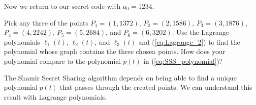 Now we return to our secret code with $a_0 = 1234$. 

\begin{pactivity} Pick any three of the points $P_1 = (1,1372)$, $P_2 = (2,1586)$, $P_3 = (3,1876)$, $P_4 = (4,2242)$, $P_5 = (5,2684)$, and $P_6 = (6,3202)$. Use the Lagrange polynomials $\ell_1(t)$, $\ell_2(t)$, and $\ell_3(t)$ and (\ref{eq:Lagrange_2}) to find the polynomial whose graph contains the three chosen points. How does your polynomial compare to the polynomial $p(t)$ in (\ref{eq:SSS_polynomial})? 

\end{pactivity}

The Shamir Secret Sharing algorithm depends on being able to find a unique polynomial $p(t)$ that passes through the created points. We can understand this result with Lagrange polynomials. 

